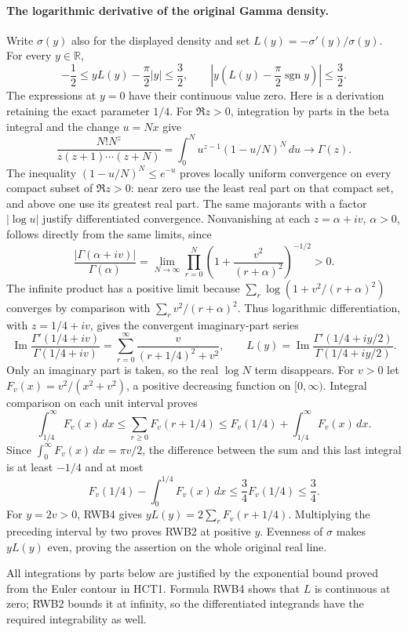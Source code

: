 \documentclass[11pt,a4paper]{article}
\begin{document}
\paragraph{The logarithmic derivative of the original Gamma density.}
Write $\sigma(y)$ also for the displayed density and set
$L(y)=-\sigma'(y)/\sigma(y)$. For every $y\in\mathbb R$,
\[
 -\frac12\le yL(y)-\frac\pi2|y|\le\frac32,
 \qquad
 \left|y\left(L(y)-\frac\pi2\operatorname{sgn}y\right)\right|
 \le\frac32.
 \tag{RWB2}
\]
The expressions at $y=0$ have their continuous value zero. Here is a
derivation retaining the exact parameter $1/4$. For $\Re z>0$,
integration by parts in the beta integral and the change $u=Nx$ give
\[
 \frac{N!N^z}{z(z+1)\cdots(z+N)}
 =\int_0^N u^{z-1}(1-u/N)^N\,du\longrightarrow\Gamma(z).
 \tag{RWB3}
\]
The inequality $(1-u/N)^N\le e^{-u}$ proves locally uniform convergence
on every compact subset of $\Re z>0$: near zero use the least real part
on that compact set, and above one use its greatest real part. The same
majorants with a factor $|\log u|$ justify differentiated convergence.
Nonvanishing at each $z=\alpha+iv$, $\alpha>0$, follows directly from
the same limits, since
\[
 \frac{|\Gamma(\alpha+iv)|}{\Gamma(\alpha)}
 =\lim_{N\to\infty}\prod_{r=0}^N
       \left(1+\frac{v^2}{(r+\alpha)^2}\right)^{-1/2}>0.
\]
The infinite product has a positive limit because
$\sum_r\log(1+v^2/(r+\alpha)^2)$ converges by comparison with
$\sum_r v^2/(r+\alpha)^2$. Thus logarithmic differentiation, with
$z=1/4+iv$, gives the convergent imaginary-part series
\[
 \operatorname{Im}\frac{\Gamma'(1/4+iv)}{\Gamma(1/4+iv)}
 =\sum_{r=0}^{\infty}\frac{v}{(r+1/4)^2+v^2},
 \qquad L(y)=\operatorname{Im}\frac{\Gamma'(1/4+iy/2)}{
                                  \Gamma(1/4+iy/2)}.
 \tag{RWB4}
\]
Only an imaginary part is taken, so the real $\log N$ term disappears.
For $v>0$ let $F_v(x)=v^2/(x^2+v^2)$, a positive decreasing function
on $[0,\infty)$. Integral comparison on each unit interval proves
\[
 \int_{1/4}^{\infty}F_v(x)\,dx
 \le\sum_{r\ge0}F_v(r+1/4)
 \le F_v(1/4)+\int_{1/4}^{\infty}F_v(x)\,dx.
\]
Since $\int_0^\infty F_v(x)\,dx=\pi v/2$, the difference between
the sum and this last integral is at least $-1/4$ and at most
\[
 F_v(1/4)-\int_0^{1/4}F_v(x)\,dx
 \le\frac34F_v(1/4)\le\frac34.
\]
For $y=2v>0$, RWB4 gives $yL(y)=2\sum_r F_v(r+1/4)$.
Multiplying the preceding interval by two proves RWB2 at positive $y$.
Evenness of $\sigma$ makes $yL(y)$ even, proving the assertion on the
whole original real line.

All integrations by parts below are justified by the exponential bound
proved from the Euler contour in HCT1. Formula RWB4 shows that $L$ is
continuous at zero; RWB2 bounds it at infinity, so the differentiated
integrands have the required integrability as well.
\end{document}
